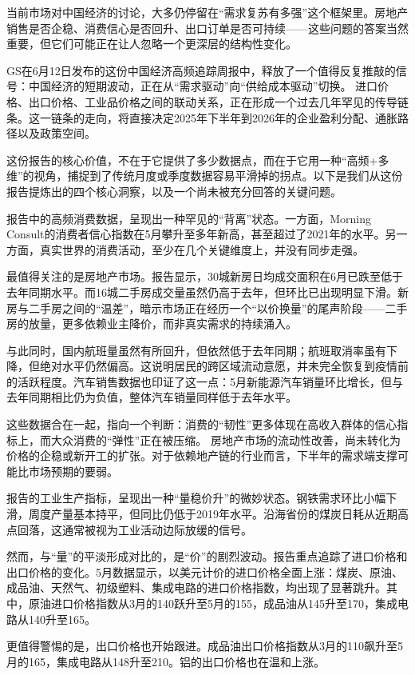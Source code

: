 \documentclass[11pt]{ctexart}
\begin{document}
当前市场对中国经济的讨论，大多仍停留在“需求复苏有多强”这个框架里。房地产销售是否企稳、消费信心是否回升、出口订单是否可持续——这些问题的答案当然重要，但它们可能正在让人忽略一个更深层的结构性变化。

GS在6月12日发布的这份中国经济高频追踪周报中，释放了一个值得反复推敲的信号：中国经济的短期波动，正在从“需求驱动”向“供给成本驱动”切换。 进口价格、出口价格、工业品价格之间的联动关系，正在形成一个过去几年罕见的传导链条。这一链条的走向，将直接决定2025年下半年到2026年的企业盈利分配、通胀路径以及政策空间。

这份报告的核心价值，不在于它提供了多少数据点，而在于它用一种“高频+多维”的视角，捕捉到了传统月度或季度数据容易平滑掉的拐点。以下是我们从这份报告提炼出的四个核心洞察，以及一个尚未被充分回答的关键问题。

报告中的高频消费数据，呈现出一种罕见的“背离”状态。一方面，Morning Consult的消费者信心指数在5月攀升至多年新高，甚至超过了2021年的水平。另一方面，真实世界的消费活动，至少在几个关键维度上，并没有同步走强。

最值得关注的是房地产市场。报告显示，30城新房日均成交面积在6月已跌至低于去年同期水平。而16城二手房成交量虽然仍高于去年，但环比已出现明显下滑。新房与二手房之间的“温差”，暗示市场正在经历一个“以价换量”的尾声阶段——二手房的放量，更多依赖业主降价，而非真实需求的持续涌入。

与此同时，国内航班量虽然有所回升，但依然低于去年同期；航班取消率虽有下降，但绝对水平仍然偏高。这说明居民的跨区域流动意愿，并未完全恢复到疫情前的活跃程度。汽车销售数据也印证了这一点：5月新能源汽车销量环比增长，但与去年同期相比仍为负值，整体汽车销量同样低于去年水平。

这些数据合在一起，指向一个判断：消费的“韧性”更多体现在高收入群体的信心指标上，而大众消费的“弹性”正在被压缩。 房地产市场的流动性改善，尚未转化为价格的企稳或新开工的扩张。对于依赖地产链的行业而言，下半年的需求端支撑可能比市场预期的要弱。

报告的工业生产指标，呈现出一种“量稳价升”的微妙状态。钢铁需求环比小幅下滑，周度产量基本持平，但同比仍低于2019年水平。沿海省份的煤炭日耗从近期高点回落，这通常被视为工业活动边际放缓的信号。

然而，与“量”的平淡形成对比的，是“价”的剧烈波动。报告重点追踪了进口价格和出口价格的变化。5月数据显示，以美元计价的进口价格全面上涨：煤炭、原油、成品油、天然气、初级塑料、集成电路的进口价格指数，均出现了显著跳升。其中，原油进口价格指数从3月的140跃升至5月的155，成品油从145升至170，集成电路从140升至165。

更值得警惕的是，出口价格也开始跟进。成品油出口价格指数从3月的110飙升至5月的165，集成电路从148升至210。铝的出口价格也在温和上涨。
\end{document}
